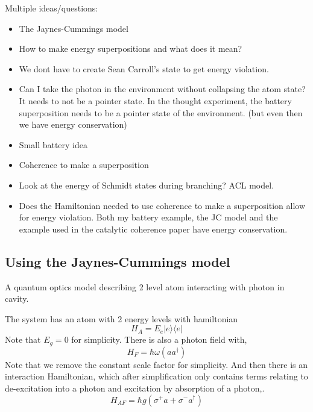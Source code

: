 \documentclass{article}
\begin{document}

Multiple ideas/questions: 
\begin{itemize}
    \item The Jaynes-Cummings model 
    \item How to make energy superpositions and what does it mean?
    \item We dont have to create Sean Carroll's state to get energy violation.
    \item Can I take the photon in the environment without collapsing the atom state? It needs to not be a pointer state. In the thought experiment, the battery superposition needs to be a pointer state of the environment. (but even then we have energy conservation) 
    \item Small battery idea
    \item Coherence to make a superposition
    \item Look at the energy of Schmidt states during branching? ACL model.
    \item Does the Hamiltonian needed to use coherence to make a superposition allow for energy violation. Both my battery example, the JC model and the example used in the catalytic coherence paper have energy conservation.
\end{itemize}

\begin{comment}
-something about how, in the ACL model, looking at graphs that show the system and environments exchange energy, is a very clear demo that the energy structure of the system and the environment can change. (leads to question, how does the distribution in the basis of E and S change as we go to equilibrium?)
\end{comment}


\subsection{Using the Jaynes-Cummings model}
A quantum optics model describing 2 level atom interacting with photon in cavity.

The system has an atom with 2 energy levels with hamiltonian 
\begin{equation}
    H_A=E_e|e\rangle\langle e|
\end{equation}
Note that $E_g=0$ for simplicity.
There is also a photon field with, 
\begin{equation}
    H_F=\hbar\omega(aa^{\dagger})
\end{equation}
Note that we remove the constant scale factor for simplicity.
And then there is an interaction Hamiltonian, which after simplification only contains terms relating to de-excitation into a photon and excitation by absorption of a photon,.
\begin{equation}
    H_{AF}=\hbar g(\sigma^{+}a+\sigma^-a^{\dagger})
\end{equation}
\end{document}
